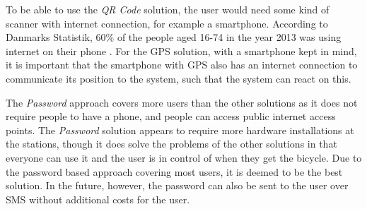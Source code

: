 To be able to use the \textit{QR Code} solution, the user would need some kind of scanner with internet connection, for example a smartphone.
According to Danmarks Statistik, 60\% of the people aged 16-74 in the year 2013 was using internet on their phone \citep{misc:dstMobilephone}.
For the GPS solution, with a smartphone kept in mind, it is important that the smartphone with GPS also has an internet connection to communicate its position to the system, such that the system can react on this.

The \textit{Password} approach covers more users than the other solutions as it does not require people to have a phone, and people can access public internet access points.
The \textit{Password} solution appears to require more hardware installations at the stations, though it does solve the problems of the other solutions in that everyone can use it and the user is in control of when they get the bicycle.
Due to the password based approach covering most users, it is deemed to be the best solution.
In the future, however, the password can also be sent to the user over SMS without additional costs for the user.